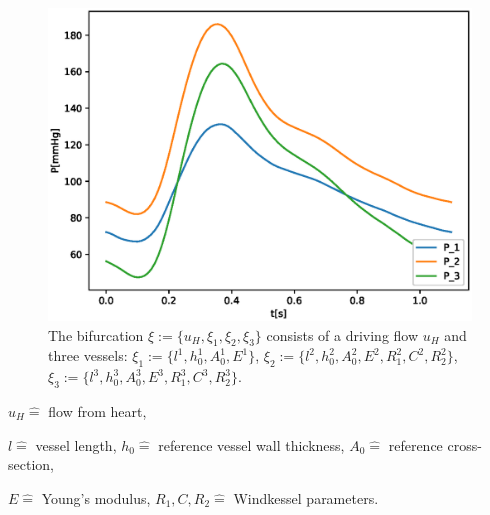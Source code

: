 \documentclass{beamer}
\begin{document}
\begin{frame}
\begin{figure}
\begin{center}
\begin{minipage}[t][0.35\paperheight][t]{\textwidth}
\begin{minipage}{0.44\textwidth}
					\includegraphics[width=\textwidth]{images/compare_output_params_P_P.eps}
				\end{minipage}
			\end{minipage}
			\begin{minipage}[t][0.34\paperheight][t]{\textwidth}
				\begin{minipage}{0.44\textwidth}
					\caption*{The bifurcation $\xi := \{u_H, \xi_1, \xi_2, \xi_3\}$ consists of a driving flow $u_H$ and three vessels: $\xi_1 := \{l^1, h_0^1, A_0^1, E^1\}$, $\xi_2 := \{l^2, h_0^2, A_0^2, E^2, R_1^2, C^2, R_2^2\}$, $\xi_3 := \{l^3, h_0^3, A_0^3, E^3, R_1^3, C^3, R_2^3\}.$}
				\end{minipage}
				\hfill
				\begin{minipage}{0.44\textwidth}
				\end{minipage}
			\end{minipage}
		\end{center}
	\end{figure}
	\begin{minipage}[t][0.1\paperheight][t]{\textwidth}
		{\tiny \centering 
			$u_H \hat{=}$ flow from heart,

			$l \hat{=}$ vessel length,
			$h_0 \hat{=}$ reference vessel wall thickness,
			$A_0 \hat{=}$ reference cross-section,

			$E \hat{=}$ Young's modulus,
			$R_1, C, R_2 \hat{=}$ Windkessel parameters.
		\par}
	\end{minipage}
\end{frame}
\end{document}
